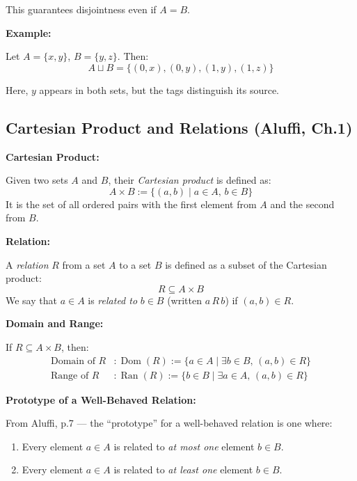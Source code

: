 \documentclass[10pt]{article}
\theoremstyle{plain}
\theoremstyle{definition}
\begin{document}
	This guarantees disjointness even if \( A = B \).
	
	\textbf{Example:}
	
	Let \( A = \{x, y\} \), \( B = \{y, z\} \). Then:
	\[
	A \sqcup B = \{(0, x), (0, y), (1, y), (1, z)\}
	\]
	
	Here, \( y \) appears in both sets, but the tags distinguish its source.
	
	
	\subsection*{Cartesian Product and Relations (Aluffi, Ch.1)}
	
	\textbf{Cartesian Product:}
	
	Given two sets \( A \) and \( B \), their \emph{Cartesian product} is defined as:
	\[
	A \times B := \{ (a, b) \mid a \in A, \, b \in B \}
	\]
	It is the set of all ordered pairs with the first element from \( A \) and the second from \( B \).
	
	\medskip
	
	\textbf{Relation:}
	
	A \emph{relation} \( R \) from a set \( A \) to a set \( B \) is defined as a subset of the Cartesian product:
	\[
	R \subseteq A \times B
	\]
	We say that \( a \in A \) is \emph{related to} \( b \in B \) (written \( a \, R \, b \)) if \( (a, b) \in R \).
	
	\medskip
	
	\textbf{Domain and Range:}
	
	If \( R \subseteq A \times B \), then:
	\begin{align*}
		\text{Domain of } R &: \operatorname{Dom}(R) := \{ a \in A \mid \exists b \in B,\, (a,b) \in R \} \\
		\text{Range of } R &: \operatorname{Ran}(R) := \{ b \in B \mid \exists a \in A,\, (a,b) \in R \}
	\end{align*}
	
	\medskip
	
	\textbf{Prototype of a Well-Behaved Relation:}
	
	From Aluffi, p.7 — the “prototype” for a well-behaved relation is one where:
	\begin{enumerate}
		\item Every element \( a \in A \) is related to \emph{at most one} element \( b \in B \).
		\item Every element \( a \in A \) is related to \emph{at least one} element \( b \in B \).
	\end{enumerate}
	
\end{document}
